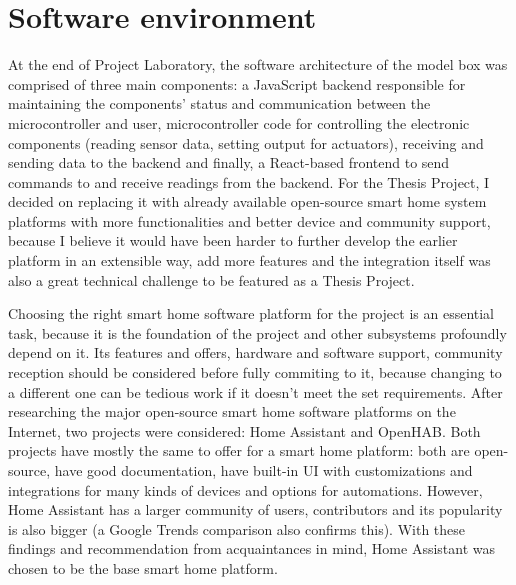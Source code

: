 \section{Software environment}

At the end of Project Laboratory, the software architecture of the model box was comprised of three main components: a JavaScript backend responsible for maintaining the components' status and communication between the microcontroller and user, microcontroller code for controlling the electronic components (reading sensor data, setting output for actuators), receiving and sending data to the backend and finally, a React-based frontend to send commands to and receive readings from the backend. For the Thesis Project, I decided on replacing it with already available open-source smart home system platforms with more functionalities and better device and community support, because I believe it would have been harder to further develop the earlier platform in an extensible way, add more features and the integration itself was also a great technical challenge to be featured as a Thesis Project.

Choosing the right smart home software platform for the project is an essential task, because it is the foundation of the project and other subsystems profoundly depend on it. Its features and offers, hardware and software support, community reception should be considered before fully commiting to it, because changing to a different one can be tedious work if it doesn't meet the set requirements. After researching the major open-source smart home software platforms on the Internet, two projects were considered: Home Assistant and OpenHAB. \cite{HAHomepage} \cite{openHABHomepage} Both projects have mostly the same to offer for a smart home platform: both are open-source, have good documentation, have built-in UI with customizations and integrations for many kinds of devices and options for automations. However, Home Assistant has a larger community of users, contributors and its popularity is also bigger (a Google Trends comparison also confirms this). \cite{WunderTechHAvsopenHAB} With these findings and recommendation from acquaintances in mind, Home Assistant was chosen to be the base smart home platform.

